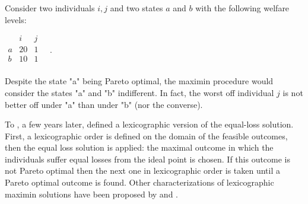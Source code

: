 \begin{example}\label{ex:sen}
	Consider two individuals $i,j$ and two states $a$ and $b$ with the following welfare levels:
	
	\begin{center}
		$
		\begin{array}{ccc}
			& i & j \\
			a &	20 & 1 \\
			b &	10 & 1 \\
		\end{array} \quad. 
		$
	\end{center}
	
	Despite the state "a" being Pareto optimal, the maximin procedure would consider the states "a" and "b" indifferent. In fact, the worst off individual $j$ is not better off under "a" than under "b" (nor the converse).
\end{example}
 
To , a few years later, \citet{Chun1991} defined a lexicographic version of the equal-loss solution. 
First, a lexicographic order is defined on the domain of the feasible outcomes, then the equal loss solution is applied: the maximal outcome in which the individuals suffer equal losses from the ideal point is chosen. If this outcome is not Pareto optimal then the next one in lexicographic order is taken until a Pareto optimal outcome is found. Other characterizations of lexicographic maximin solutions have been proposed by \citet{Sen2017} and \citet{Chang1999}.

